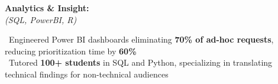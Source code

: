 \documentclass[11pt,a4paper]{article}
\begin{document}
\begin{minipage}{\textwidth}
\begin{minipage}[t]{\textwidth-19pt}
\vspace{6pt}

\noindent\begin{minipage}[t]{0.28\textwidth}
\textbf{\color{headerblue}Analytics \& Insight:}\\[0pt]
\textit{(SQL, PowerBI, R)}
\end{minipage}%
\hfill%
\begin{minipage}[t]{0.68\textwidth}
\textbullet\ Engineered Power BI dashboards eliminating \textbf{70\% of ad-hoc requests}, reducing prioritization time by \textbf{60\%}\\
\textbullet\ Tutored \textbf{100+ students} in SQL and Python, specializing in translating technical findings for non-technical audiences
\end{minipage}

\end{minipage}
\end{minipage}

\vspace{6pt}
\end{document}

